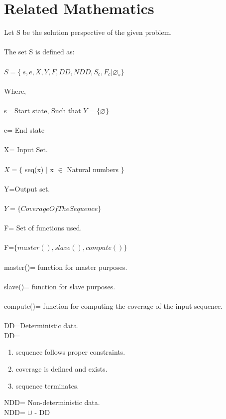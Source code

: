 \documentclass[10pt,a4paper]{article}
\begin{document}
\section{Related Mathematics}
Let S be the solution perspective of the given problem.
\\\\The set S is defined as:
\\\\$S=\lbrace\ s,e,X,Y,F,DD,NDD,S_{c},F_{c}|\varnothing_{s}\rbrace$
\\\\Where,
\\\\s= Start state,  Such that $Y=\lbrace \varnothing \rbrace$ 
\\\\e= End state 
\\\\X= Input Set.
\\\\$X=\lbrace$ seq(x) $\mid$ x $\in$ Natural numbers $\rbrace$
\\\\Y=Output set.
\\\\$Y=\lbrace Coverage Of The Sequence \rbrace $
\\\\F= Set of functions used.
\\\\F=$\lbrace master(), slave(), compute()\rbrace$
\\\\master()= function for master purposes.
\\\\slave()= function for slave purposes.
\\\\compute()= function for computing the coverage of the input sequence.
\\\\DD=Deterministic data.
\\DD=
\begin{enumerate}
\item sequence follows proper constraints.
\item coverage is defined and exists.
\item sequence terminates.
\end{enumerate}
NDD= Non-deterministic data.
\\NDD= $\cup$ - DD
\end{document}
